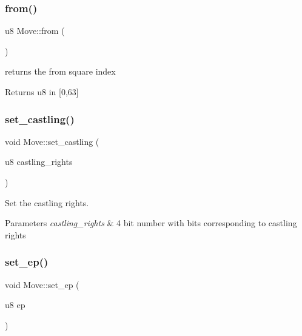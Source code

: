 \subsubsection{\texorpdfstring{from()}{from()}}
{\footnotesize\ttfamily u8 Move\+::from (\begin{DoxyParamCaption}{ }\end{DoxyParamCaption})\hspace{0.3cm}{\ttfamily [inline]}}



returns the from square index 

\begin{DoxyReturn}{Returns}
u8 in \mbox{[}0,63\mbox{]} 
\end{DoxyReturn}
\mbox{\label{structMove_ac219fedb401bec50df805eeb8c4bfbfd}} 
\subsubsection{\texorpdfstring{set\+\_\+castling()}{set\_castling()}}
{\footnotesize\ttfamily void Move\+::set\+\_\+castling (\begin{DoxyParamCaption}\item[{u8}]{castling\+\_\+rights }\end{DoxyParamCaption})\hspace{0.3cm}{\ttfamily [inline]}}



Set the castling rights. 


\begin{DoxyParams}{Parameters}
{\em castling\+\_\+rights} & 4 bit number with bits corresponding to castling rights \\
\hline
\end{DoxyParams}
\mbox{\label{structMove_a73a4d89daf1871694aebeb9f37cf205d}} 
\subsubsection{\texorpdfstring{set\+\_\+ep()}{set\_ep()}}
{\footnotesize\ttfamily void Move\+::set\+\_\+ep (\begin{DoxyParamCaption}\item[{u8}]{ep }\end{DoxyParamCaption})\hspace{0.3cm}{\ttfamily [inline]}}



